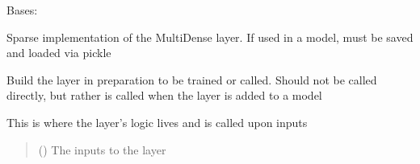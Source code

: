 \documentclass[letterpaper,10pt,english]{sphinxmanual}
\begin{document}
\begin{fulllineitems}
\label{\detokenize{beyondml.tflow.layers:beyondml.tflow.layers.SparseMultiDense.SparseMultiDense}}
\pysigstartsignatures
{}
\pysigstopsignatures
\sphinxAtStartPar
Bases: 

\sphinxAtStartPar
Sparse implementation of the MultiDense layer. If used in a model, must be saved and loaded via pickle

\begin{fulllineitems}
\label{\detokenize{beyondml.tflow.layers:beyondml.tflow.layers.SparseMultiDense.SparseMultiDense.build}}
\pysigstartsignatures
{}
\pysigstopsignatures
\sphinxAtStartPar
Build the layer in preparation to be trained or called. Should not be called directly,
but rather is called when the layer is added to a model

\end{fulllineitems}


\begin{fulllineitems}
\label{\detokenize{beyondml.tflow.layers:beyondml.tflow.layers.SparseMultiDense.SparseMultiDense.call}}
\pysigstartsignatures
{}
\pysigstopsignatures
\sphinxAtStartPar
This is where the layer’s logic lives and is called upon inputs
\begin{quote}\begin{description}
\sphinxAtStartPar
{} () \textendash{} The inputs to the layer


\end{description}
\end{quote}
\end{fulllineitems}
\end{fulllineitems}
\end{document}
